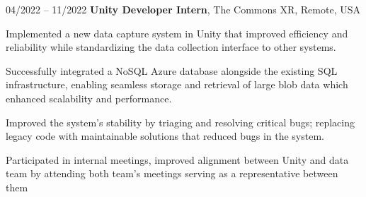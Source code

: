 \begin{twocolentry}{
    04/2022 – 11/2022
}
\textbf{Unity Developer Intern}, The Commons XR, Remote, USA\end{twocolentry}

\vspace{0.10 cm}
\begin{onecolentry}
   \begin{highlights}
       \item Implemented a new data capture system in Unity that improved efficiency and reliability while standardizing the data collection interface to other systems.  
       \item Successfully integrated a NoSQL Azure database alongside the existing SQL infrastructure, enabling seamless storage and retrieval of large blob data which enhanced scalability and performance.  
       \item Improved the system's stability by triaging and resolving critical bugs; replacing legacy code with maintainable solutions that reduced bugs in the system.
       \item Participated in internal meetings, improved alignment between Unity and data team by attending both team's meetings serving as a representative between them
   \end{highlights}
\end{onecolentry}